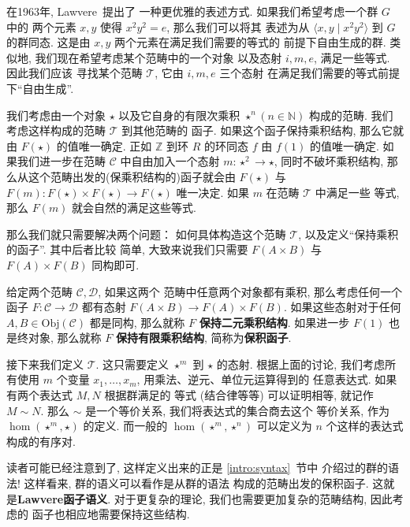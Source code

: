 在1963年, Lawvere~\cite{Lawvere:1963:functorial}提出了
一种更优雅的表述方式. 如果我们希望考虑一个群 \(G\) 中的
两个元素 \(x,y\) 使得 \(x^2y^2 = e\), 那么我们可以将其
表述为从 \(\langle x,y \mid x^2y^2 \rangle\) 到 \(G\)
的群同态. 这是由 \(x,y\) 两个元素在满足我们需要的等式的
前提下自由生成的群.
类似地, 我们现在希望考虑某个范畴中的一个对象
以及态射 \(i,m,e\), 满足一些等式. 因此我们应该
寻找某个范畴 \(\mathcal T\), 它由 \(i,m,e\) 三个态射
在满足我们需要的等式前提下“自由生成”.

我们考虑由一个对象 \(\star\)
以及它自身的有限次乘积 \(\star^n (n \in \mathbb N)\) 构成的范畴.
我们考虑这样构成的范畴 \(\mathcal T\) 到其他范畴的
函子. 如果这个函子保持乘积结构, 那么它就由 \(F(\star)\)
的值唯一确定. 正如 \(\mathbb Z\) 到环 \(R\) 的环同态 \(f\)
由 \(f(1)\) 的值唯一确定. 如果我们进一步在范畴 \(\mathcal C\)
中自由加入一个态射 \(m:\star^2 \to \star\), 同时不破坏乘积结构,
那么从这个范畴出发的(保乘积结构的)函子就会由 \(F(\star)\)
与 \(F(m) : F(\star) \times F(\star) \to F(\star)\)
唯一决定. 如果 \(m\) 在范畴 \(\mathcal T\) 中满足一些
等式, 那么 \(F(m)\) 就会自然的满足这些等式.

那么我们就只需要解决两个问题： 如何具体构造这个范畴
\(\mathcal T\), 以及定义“保持乘积的函子”. 其中后者比较
简单, 大致来说我们只需要 \(F(A \times B)\) 与 \(F(A) \times F(B)\) 同构即可.
\begin{definition}
给定两个范畴 \(\mathcal C,\mathcal D\), 如果这两个
范畴中任意两个对象都有乘积, 那么考虑任何一个函子 \(F : \mathcal C \to \mathcal D\)
都有态射 \(F(A \times B) \to F(A) \times F(B)\).
如果这些态射对于任何 \(A,B \in \mathrm{Obj}(\mathcal C)\)
都是同构, 那么就称 \(F\) \textbf{保持二元乘积结构}.
如果进一步 \(F(1)\) 也是终对象, 那么就称 \(F\)
\textbf{保持有限乘积结构}, 简称为\textbf{保积函子}.
\end{definition}

接下来我们定义 \(\mathcal T\). 这只需要定义 \(\star^m\) 到
\(\star\) 的态射. 根据上面的讨论,
我们考虑所有使用 \(m\) 个变量
\(x_1,\dots,x_m\), 用乘法、逆元、单位元运算得到的
任意表达式. 如果有两个表达式 \(M,N\) 根据群满足的
等式 (结合律等等) 可以证明相等, 就记作 \(M \sim N\).
那么 \(\sim\) 是一个等价关系, 我们将表达式的集合商去这个
等价关系, 作为 \(\hom(\star^m, \star)\) 的定义.
而一般的 \(\hom(\star^m, \star^n)\) 可以定义为
\(n\) 个这样的表达式构成的有序对.

读者可能已经注意到了, 这样定义出来的正是 \ref{intro:syntax}~节中
介绍过的群的语法! 这样看来, 群的语义可以看作是从群的语法
构成的范畴出发的保积函子. 这就是\textbf{Lawvere函子语义}.
对于更复杂的理论, 我们也需要更加复杂的范畴结构, 因此考虑的
函子也相应地需要保持这些结构.

